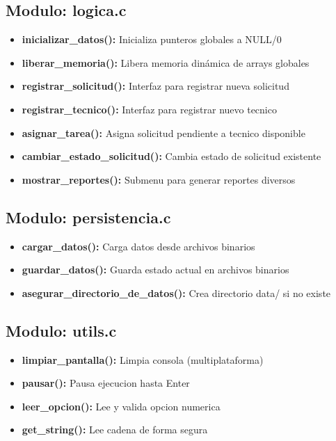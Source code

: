 \documentclass[12pt, a4paper]{article}
\begin{document}
\subsection{Modulo: logica.c}
\begin{itemize}[left=0pt]
\item \textbf{inicializar\_datos():} Inicializa punteros globales a NULL/0
\item \textbf{liberar\_memoria():} Libera memoria dinámica de arrays globales
\item \textbf{registrar\_solicitud():} Interfaz para registrar nueva solicitud
\item \textbf{registrar\_tecnico():} Interfaz para registrar nuevo tecnico
\item \textbf{asignar\_tarea():} Asigna solicitud pendiente a tecnico disponible
\item \textbf{cambiar\_estado\_solicitud():} Cambia estado de solicitud existente
\item \textbf{mostrar\_reportes():} Submenu para generar reportes diversos
\end{itemize}

\subsection{Modulo: persistencia.c}
\begin{itemize}[left=0pt]
\item \textbf{cargar\_datos():} Carga datos desde archivos binarios
\item \textbf{guardar\_datos():} Guarda estado actual en archivos binarios
\item \textbf{asegurar\_directorio\_de\_datos():} Crea directorio data/ si no existe
\end{itemize}

\subsection{Modulo: utils.c}
\begin{itemize}[left=0pt]
\item \textbf{limpiar\_pantalla():} Limpia consola (multiplataforma)
\item \textbf{pausar():} Pausa ejecucion hasta Enter
\item \textbf{leer\_opcion():} Lee y valida opcion numerica
\item \textbf{get\_string():} Lee cadena de forma segura
\end{itemize}
\end{document}
